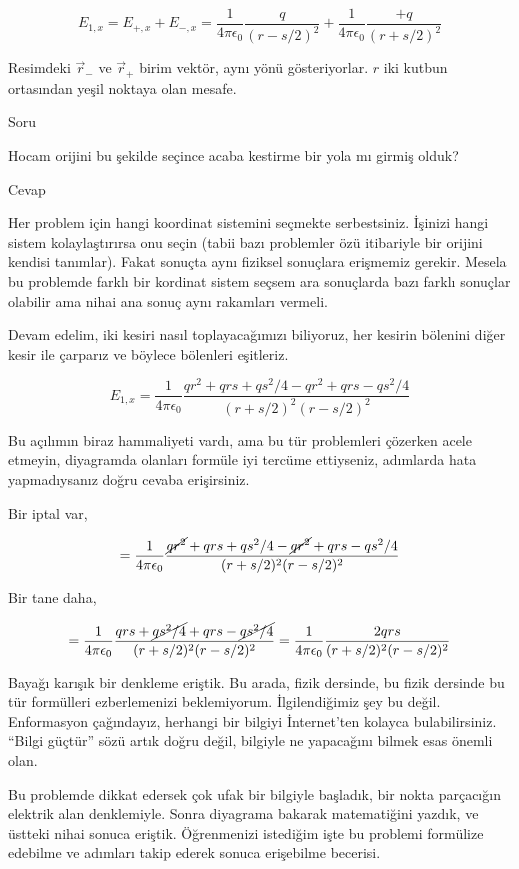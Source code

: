 \documentclass[12pt,fleqn]{article}\usepackage{../../common}
\begin{document}
$$
E_{1,x} = E_{+,x} + E_{-,x} =
\frac{1}{4\pi\epsilon_0} \frac{q}{(r-s/2)^2} +
\frac{1}{4\pi\epsilon_0} \frac{+q}{(r+s/2)^2} 
$$

Resimdeki $\vec{r}_{-}$ ve $\vec{r}_{+}$ birim vektör, aynı yönü
gösteriyorlar. $r$ iki kutbun ortasından yeşil noktaya olan mesafe. 

Soru

Hocam orijini bu şekilde seçince acaba kestirme bir yola mı girmiş olduk?

Cevap

Her problem için hangi koordinat sistemini seçmekte serbestsiniz. İşinizi hangi
sistem kolaylaştırırsa onu seçin (tabii bazı problemler özü itibariyle bir
orijini kendisi tanımlar). Fakat sonuçta aynı fiziksel sonuçlara erişmemiz
gerekir. Mesela bu problemde farklı bir kordinat sistem seçsem ara sonuçlarda
bazı farklı sonuçlar olabilir ama nihai ana sonuç aynı rakamları vermeli.

Devam edelim, iki kesiri nasıl toplayacağımızı biliyoruz, her kesirin bölenini
diğer kesir ile çarparız ve böylece bölenleri eşitleriz.

$$
E_{1,x} =
\frac{1}{4\pi\epsilon_0}
\frac{qr^2 + qrs + qs^2 / 4 - qr^2 + qrs - qs^2 / 4}
     {(r+s/2)^2  (r-s/2)^2 } 
$$

Bu açılımın biraz hammaliyeti vardı, ama bu tür problemleri çözerken acele
etmeyin, diyagramda olanları formüle iyi tercüme ettiyseniz, adımlarda hata
yapmadıysanız doğru cevaba erişirsiniz. 

Bir iptal var,

$$
= \frac{1}{4\pi\epsilon_0}
\frac{\cancel{qr^2} + qrs + qs^2 / 4 - \cancel{qr^2} + qrs - qs^2 / 4}
     {(r+s/2)^2  (r-s/2)^2 } 
$$

Bir tane daha,
     
$$
= \frac{1}{4\pi\epsilon_0}
\frac{qrs + \cancel{qs^2 / 4} + qrs - \cancel{qs^2 / 4}}
     {(r+s/2)^2  (r-s/2)^2 }  =
\frac{1}{4\pi\epsilon_0}
\frac{2 qrs} {(r+s/2)^2  (r-s/2)^2 }       
$$

Bayağı karışık bir denkleme eriştik. Bu arada, fizik dersinde, bu fizik dersinde
bu tür formülleri ezberlemenizi beklemiyorum. İlgilendiğimiz şey bu
değil. Enformasyon çağındayız, herhangi bir bilgiyi İnternet'ten kolayca
bulabilirsiniz. ``Bilgi güçtür'' sözü artık doğru değil, bilgiyle ne yapacağını
bilmek esas önemli olan.

Bu problemde dikkat edersek çok ufak bir bilgiyle başladık, bir nokta parçacığın
elektrik alan denklemiyle. Sonra diyagrama bakarak matematiğini yazdık, ve
üstteki nihai sonuca eriştik. Öğrenmenizi istediğim işte bu problemi formülize
edebilme ve adımları takip ederek sonuca erişebilme becerisi. 
\end{document}
